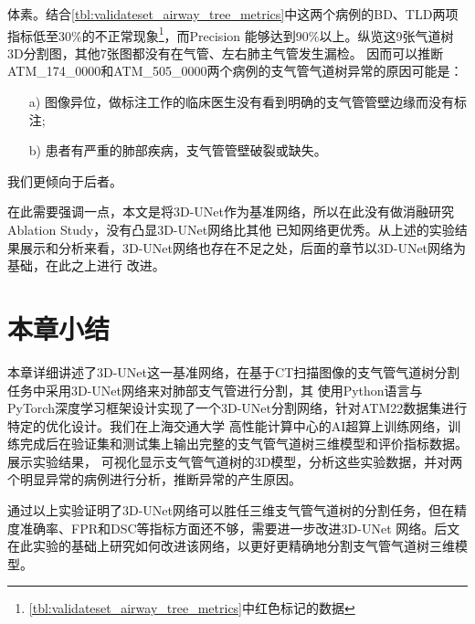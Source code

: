 体素。结合\autoref{tbl:validateset_airway_tree_metrics}中这两个病例的BD、TLD两项指标低至30\%的不正常现象\footnote{
\autoref{tbl:validateset_airway_tree_metrics}中红色标记的数据}，而Precision
能够达到90\%以上。纵览这9张气道树3D分割图，其他7张图都没有在气管、左右肺主气管发生漏检。 
因而可以推断ATM\_174\_0000和ATM\_505\_0000两个病例的支气管气道树异常的原因可能是：
\begin{enumerate}
    \item[a)] 图像异位，做标注工作的临床医生没有看到明确的支气管管壁边缘而没有标注;
    \item[b)] 患者有严重的肺部疾病，支气管管壁破裂或缺失。
\end{enumerate}
我们更倾向于后者。

在此需要强调一点，本文是将3D-UNet作为基准网络，所以在此没有做消融研究Ablation Study，没有凸显3D-UNet网络比其他
已知网络更优秀。从上述的实验结果展示和分析来看，3D-UNet网络也存在不足之处，后面的章节以3D-UNet网络为基础，在此之上进行
改进。

\section{本章小结}

本章详细讲述了3D-UNet这一基准网络，在基于CT扫描图像的支气管气道树分割任务中采用3D-UNet网络来对肺部支气管进行分割，其
使用Python语言与PyTorch深度学习框架设计实现了一个3D-UNet分割网络，针对ATM22数据集进行特定的优化设计。我们在上海交通大学
高性能计算中心的AI超算上训练网络，训练完成后在验证集和测试集上输出完整的支气管气道树三维模型和评价指标数据。展示实验结果，
可视化显示支气管气道树的3D模型，分析这些实验数据，并对两个明显异常的病例进行分析，推断异常的产生原因。

通过以上实验证明了3D-UNet网络可以胜任三维支气管气道树的分割任务，但在精度准确率、FPR和DSC等指标方面还不够，需要进一步改进3D-UNet
网络。后文在此实验的基础上研究如何改进该网络，以更好更精确地分割支气管气道树三维模型。
